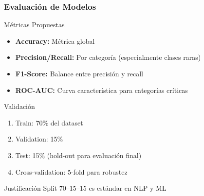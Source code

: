 \documentclass[aspectratio=169,10pt]{beamer}
\begin{document}
\begin{frame}
  \frametitle{Evaluación de Modelos}
  
  \begin{block}{Métricas Propuestas}
    \begin{itemize}
      \item \textbf{Accuracy:} Métrica global
      \item \textbf{Precision/Recall:} Por categoría (especialmente clases raras)
      \item \textbf{F1-Score:} Balance entre precisión y recall
      \item \textbf{ROC-AUC:} Curva característica para categorías críticas
    \end{itemize}
  \end{block}

  \begin{block}{Validación}
    \begin{enumerate}
      \item Train: 70\% del dataset
      \item Validation: 15\%
      \item Test: 15\% (hold-out para evaluación final)
      \item Cross-validation: 5-fold para robustez
    \end{enumerate}
  \end{block}

  \begin{block}{Justificación \cite{bishop2006pattern}}
    Split 70--15--15 es estándar en NLP y ML
  \end{block}
\end{frame}
\end{document}
